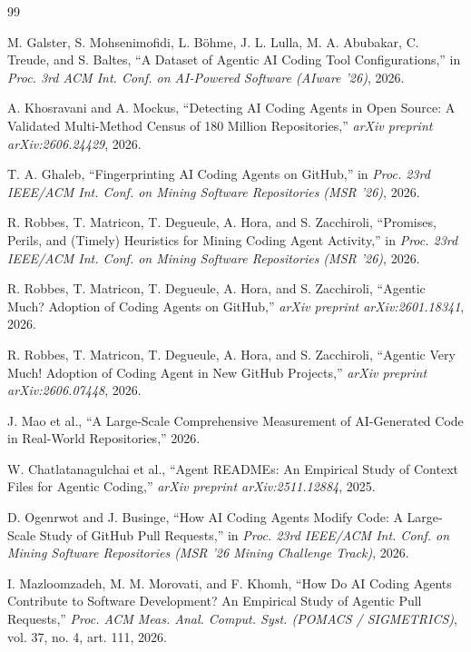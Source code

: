 \documentclass[11pt,a4paper]{article}
\begin{document}
\begin{thebibliography}{99}

M. Galster, S. Mohsenimofidi, L. B\"{o}hme, J. L. Lulla, M. A. Abubakar, C. Treude, and S. Baltes,
``A Dataset of Agentic AI Coding Tool Configurations,''
in \textit{Proc. 3rd ACM Int. Conf. on AI-Powered Software (AIware '26)}, 2026.

A. Khosravani and A. Mockus,
``Detecting AI Coding Agents in Open Source: A Validated Multi-Method Census of 180 Million Repositories,''
\textit{arXiv preprint arXiv:2606.24429}, 2026.

T. A. Ghaleb,
``Fingerprinting AI Coding Agents on GitHub,''
in \textit{Proc. 23rd IEEE/ACM Int. Conf. on Mining Software Repositories (MSR '26)}, 2026.

R. Robbes, T. Matricon, T. Degueule, A. Hora, and S. Zacchiroli,
``Promises, Perils, and (Timely) Heuristics for Mining Coding Agent Activity,''
in \textit{Proc. 23rd IEEE/ACM Int. Conf. on Mining Software Repositories (MSR '26)}, 2026.

R. Robbes, T. Matricon, T. Degueule, A. Hora, and S. Zacchiroli,
``Agentic Much? Adoption of Coding Agents on GitHub,''
\textit{arXiv preprint arXiv:2601.18341}, 2026.

R. Robbes, T. Matricon, T. Degueule, A. Hora, and S. Zacchiroli,
``Agentic Very Much! Adoption of Coding Agent in New GitHub Projects,''
\textit{arXiv preprint arXiv:2606.07448}, 2026.

J. Mao et al.,
``A Large-Scale Comprehensive Measurement of AI-Generated Code in Real-World Repositories,''
2026.

W. Chatlatanagulchai et al.,
``Agent READMEs: An Empirical Study of Context Files for Agentic Coding,''
\textit{arXiv preprint arXiv:2511.12884}, 2025.

D. Ogenrwot and J. Businge,
``How AI Coding Agents Modify Code: A Large-Scale Study of GitHub Pull Requests,''
in \textit{Proc. 23rd IEEE/ACM Int. Conf. on Mining Software Repositories (MSR '26 Mining Challenge Track)}, 2026.

I. Mazloomzadeh, M. M. Morovati, and F. Khomh,
``How Do AI Coding Agents Contribute to Software Development? An Empirical Study of Agentic Pull Requests,''
\textit{Proc. ACM Meas. Anal. Comput. Syst. (POMACS / SIGMETRICS)}, vol. 37, no. 4, art. 111, 2026.


\end{thebibliography}
\end{document}
